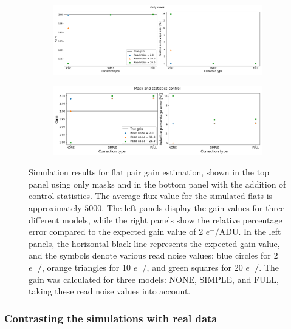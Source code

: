 \begin{figure}[!htb]
     \centering
     \begin{subfigure}[b]{\textwidth}
         \centering
         \includegraphics[width=\textwidth]{Figures/Simulation_masks.png}
     \end{subfigure}
     \vspace{3mm}
     \begin{subfigure}[b]{\textwidth}
         \centering
         \includegraphics[width=\textwidth]{Figures/Simulation_masks_stats.png}
     \end{subfigure}
        \caption{Simulation results for flat pair gain estimation, shown in the top panel using only masks and in the bottom panel with the addition of control statistics. The average flux value for the simulated flats is approximately $5000$. The left panels display the gain values for three different models, while the right panels show the relative percentage error compared to the expected gain value of 2 $e^-/$ADU. In the left panels, the horizontal black line represents the expected gain value, and the symbols denote various read noise values: blue circles for 2 $e^-/$, orange triangles for 10 $e^-/$, and green squares for 20 $e^-/$. The gain was calculated for three models: NONE, SIMPLE, and FULL, taking these read noise values into account.}
        \label{fig:simulation_masks}
\end{figure}

\subsubsection{Contrasting the simulations with real data} \label{subsubsec:results_gainflats_realdata}

